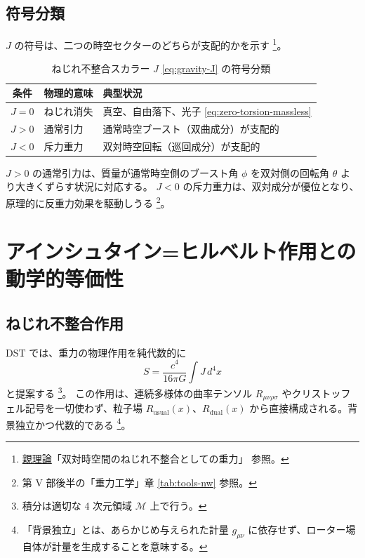 \documentclass[dvipdfmx,a4paper,oneside]{jsbook}
\numberwithin{equation}{chapter}
\begin{document}
\subsection{符号分類}

\(J\) の符号は、二つの時空セクターのどちらが支配的かを示す \footnote{\hyperref[sec:sister-manuscripts]{親理論}「双対時空間のねじれ不整合としての重力」 参照。}。

\begin{table}[htbp]
  \centering
  \caption{ねじれ不整合スカラー \(J\) \eqref{eq:gravity-J} の符号分類}
  \label{tab:J-signs}
  \begin{tabular}{@{}cll@{}}
    \toprule
    条件 & 物理的意味 & 典型状況 \\
    \midrule
    \(J = 0\) & ねじれ消失 & 真空、自由落下、光子 \eqref{eq:zero-torsion-massless} \\
    \(J > 0\) & 通常引力 & 通常時空ブースト（双曲成分）が支配的 \\
    \(J < 0\) & 斥力重力 & 双対時空回転（巡回成分）が支配的 \\
    \bottomrule
  \end{tabular}
\end{table}

\(J > 0\) の通常引力は、質量が通常時空側のブースト角 \(\phi\) を双対側の回転角 \(\theta\) より大きくずらす状況に対応する。
\(J < 0\) の斥力重力は、双対成分が優位となり、原理的に反重力効果を駆動しうる \footnote{第 V 部後半の「重力工学」章 \eqref{tab:tools-nw} 参照。}。

\section{アインシュタイン=ヒルベルト作用との動学的等価性}

\subsection{ねじれ不整合作用}

DST では、重力の物理作用を純代数的に
\begin{equation}
  S = \frac{c^4}{16\pi G} \int J\, d^4x
  \label{eq:gravity-action}
\end{equation}
と提案する \footnote{積分は適切な 4 次元領域 \(\mathcal{M}\) 上で行う。}。
この作用は、連続多様体の曲率テンソル \(R_{\mu\nu\rho\sigma}\) やクリストッフェル記号を一切使わず、粒子場 \(R_{\mathrm{usual}}(x)\)、\(R_{\mathrm{dual}}(x)\) から直接構成される。背景独立かつ代数的である \footnote{「背景独立」とは、あらかじめ与えられた計量 \(g_{\mu\nu}\) に依存せず、ローター場自体が計量を生成することを意味する。}。
\end{document}
